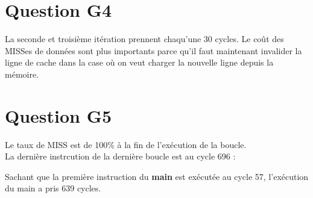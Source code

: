 \documentclass[10pt]{article}
\begin{document}
\section{Question G4}
La seconde et troisième itération prennent chaqu'une 30 cycles. Le coût des
MISSes de données sont plus importants parce qu'il faut maintenant invalider la
ligne de cache dans la case où on veut charger la nouvelle ligne depuis la
mémoire.

\section{Question G5}
Le taux de MISS est de 100\% à la fin de l'exécution de la boucle.\\
La dernière instrcution de la dernière boucle est au cycle 696 :

Sachant que la première instruction du {\bf main} est exécutée au cycle 57,
l'exécution du main a pris 639 cycles.
\end{document}
